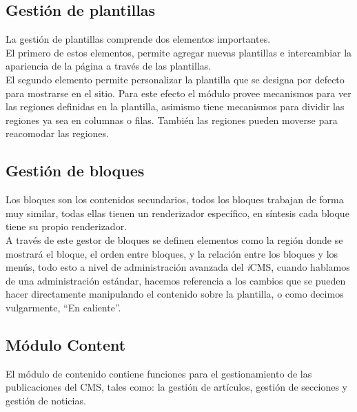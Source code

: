 \subsection{Gesti\'on de plantillas}
La gesti\'on de plantillas comprende dos elementos importantes.\\
El primero de estos elementos, permite agregar nuevas plantillas e intercambiar la apariencia de la p\'agina a trav\'es de las plantillas.\\
El segundo elemento permite personalizar la plantilla que se designa por defecto para mostrarse en el sitio. Para este efecto el m\'odulo provee mecanismos para ver las regiones definidas en la plantilla, asimismo tiene mecanismos para dividir las regiones ya sea en columnas o filas. Tambi\'en las regiones pueden moverse para reacomodar las regiones.\\

\subsection{Gesti\'on de bloques}
Los bloques son los contenidos secundarios, todos los bloques trabajan de forma muy similar, todas ellas tienen un renderizador espec\'ifico, en s\'intesis cada bloque tiene su propio renderizador.\\
A trav\'es de este gestor de bloques se definen elementos como la regi\'on donde se mostrar\'a el bloque, el orden entre bloques, y la relaci\'on entre los bloques y los men\'us, todo esto a nivel de administraci\'on avanzada del \textit{i}CMS, cuando hablamos de una administraci\'on est\'andar, hacemos referencia a los cambios que se pueden hacer directamente manipulando el contenido sobre la plantilla, o como decimos vulgarmente, ``En caliente''.

\subsection{M\'odulo Content}
El m\'odulo de contenido contiene funciones para el gestionamiento de las publicaciones del CMS, tales como: la gesti\'on de art\'iculos, gesti\'on de secciones y gesti\'on de noticias.

